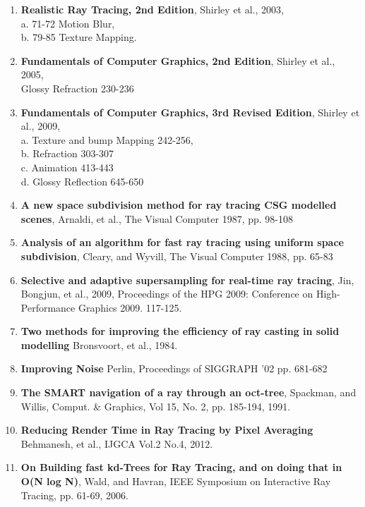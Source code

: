 \documentclass {article}
\begin{document}
\begin{description}
\begin{enumerate}
	\item {\bf Realistic Ray Tracing, 2nd Edition}, Shirley et al., 2003,\\
	a. 71-72 Motion Blur, \\
	b. 79-85 Texture Mapping.
	
	\item {\bf Fundamentals of Computer Graphics, 2nd Edition}, Shirley et al., 2005,\\
	Glossy Refraction 230-236
	
	\item {\bf Fundamentals of Computer Graphics, 3rd Revised Edition}, Shirley et al., 2009,\\
	a. Texture and bump Mapping 242-256,\\
	b. Refraction 303-307\\
	c. Animation 413-443\\
	d. Glossy Reflection 645-650
	
	\item {\bf A new space subdivision method for ray tracing CSG modelled scenes}, Arnaldi, et al., The Visual Computer 1987, pp. 98-108
	
	\item {\bf Analysis of an algorithm for fast ray tracing using uniform space subdivision}, Cleary, and Wyvill, The Visual Computer 1988, pp. 65-83
	
	\item {\bf Selective and adaptive supersampling for real-time ray tracing}, Jin, Bongjun, et al., 2009,
	Proceedings of the HPG 2009: Conference on High-Performance Graphics 2009. 117-125. 
	
	\item {\bf Two methods for improving the efficiency of ray casting in solid modelling} Bronsvoort, et al., 1984.
	
	\item {\bf Improving Noise} Perlin, Proceedings of SIGGRAPH '02 pp. 681-682
	
	\item {\bf The SMART navigation of a ray through an oct-tree}, Spackman, and Willis, Comput. \& Graphics, Vol 15, No. 2, pp. 185-194, 1991.
	
	\item {\bf Reducing Render Time in Ray Tracing by Pixel Averaging} Behmanesh, et al., IJGCA Vol.2 No.4, 2012.
	
	\item {\bf On Building fast kd-Trees for Ray Tracing, and on doing that in O(N log N)}, Wald, and Havran, IEEE Symposium on Interactive Ray Tracing, pp. 61-69, 2006.
	

\end{enumerate}
\end{description}
\end{document}
